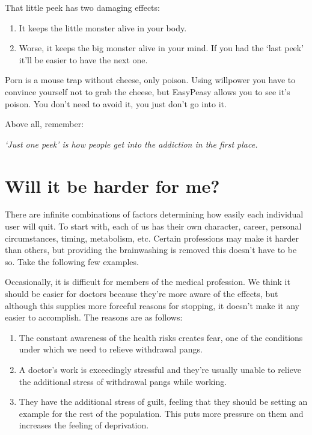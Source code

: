 \documentclass[
]{book}
\begin{document}
That little peek has two damaging effects:

\begin{enumerate}
\def\labelenumi{\arabic{enumi}.}
\item
  It keeps the little monster alive in your body.
\item
  Worse, it keeps the big monster alive in your mind. If you had the `last peek' it'll be easier to have the next one.
\end{enumerate}

Porn is a mouse trap without cheese, only poison. Using willpower you have to convince yourself not to grab the cheese, but EasyPeasy allows you to see it's poison. You don't need to avoid it, you just don't go into it.

Above all, remember:

\emph{`Just one peek' is how people get into the addiction in the first place.}

\hypertarget{will-it-be-harder-for-me}{%
\chapter{Will it be harder for me?}\label{will-it-be-harder-for-me}}

There are infinite combinations of factors determining how easily each individual user will quit. To start with, each of us has their own character, career, personal circumstances, timing, metabolism, etc. Certain professions may make it harder than others, but providing the brainwashing is removed this doesn't have to be so. Take the following few examples.

Occasionally, it is difficult for members of the medical profession. We think it should be easier for doctors because they're more aware of the effects, but although this supplies more forceful reasons for stopping, it doesn't make it any easier to accomplish. The reasons are as follows:

\begin{enumerate}
\def\labelenumi{\arabic{enumi}.}
\item
  The constant awareness of the health risks creates fear, one of the conditions under which we need to relieve withdrawal pangs.
\item
  A doctor's work is exceedingly stressful and they're usually unable to relieve the additional stress of withdrawal pangs while working.
\item
  They have the additional stress of guilt, feeling that they should be setting an example for the rest of the population. This puts more pressure on them and increases the feeling of deprivation.
\end{enumerate}
\end{document}
